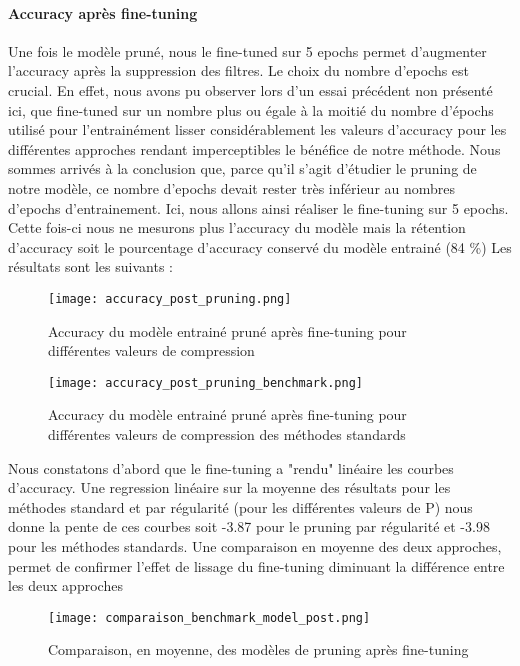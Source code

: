 \documentclass[12pt,a4paper]{article}
\begin{document}
\paragraph{Accuracy après fine-tuning}
Une fois le modèle pruné, nous le fine-tuned sur 5 epochs permet d'augmenter l'accuracy après la suppression des filtres. Le choix du nombre d'epochs est crucial. En effet, nous avons pu observer lors d'un essai précédent non présenté ici, que fine-tuned sur un nombre plus ou égale à la moitié du nombre d'épochs utilisé pour l'entrainément lisser considérablement les valeurs d'accuracy pour les différentes approches rendant imperceptibles le bénéfice de notre méthode. 
Nous sommes arrivés à la conclusion que, parce qu'il s'agit d'étudier le pruning de notre modèle, ce nombre d'epochs devait rester très inférieur au nombres d'epochs d'entrainement. Ici, nous allons ainsi réaliser le fine-tuning sur 5 epochs. Cette fois-ci nous ne mesurons plus l'accuracy du modèle mais la rétention d'accuracy soit le pourcentage d'accuracy conservé du modèle entrainé (84 \%) Les résultats sont les suivants : 
\begin{figure}[H] %
    \centering    %
    \texttt{[image: accuracy\_post\_pruning.png]} %
    \caption{Accuracy du modèle entrainé pruné après fine-tuning pour différentes valeurs de compression} %
    \label{fig:mon_image} %
\end{figure}
\begin{figure}[H] %
    \centering    %
    \texttt{[image: accuracy\_post\_pruning\_benchmark.png]} %
    \caption{Accuracy du modèle entrainé pruné après fine-tuning pour différentes valeurs de compression des méthodes standards} %
    \label{fig:mon_image} %
\end{figure}
Nous constatons d'abord que le fine-tuning a "rendu" linéaire les courbes d'accuracy. Une regression linéaire sur la moyenne des résultats pour les méthodes standard et par régularité (pour les différentes valeurs de P) nous donne la pente de ces courbes soit -3.87 pour le pruning par régularité et -3.98 pour les méthodes standards. 
Une comparaison en moyenne des deux approches, permet de confirmer l'effet de lissage du fine-tuning diminuant la différence entre les deux approches 
\begin{figure}[H] %
    \centering    %
    \texttt{[image: comparaison\_benchmark\_model\_post.png]} %
    \caption{Comparaison, en moyenne, des modèles de pruning après fine-tuning} %
    \label{fig:mon_image} %
\end{figure}
\end{document}
